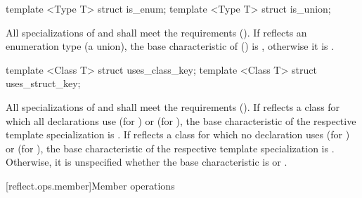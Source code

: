 \begin{std.txt}
\begin{itemdecl}
template <Type T> struct is_enum;
template <Type T> struct is_union;
\end{itemdecl}

\begin{itemdescr}
\pnum
All specializations of  and  shall meet the  requirements (). If  reflects an enumeration type (a union), the base characteristic of  () is , otherwise it is .
\end{itemdescr}

\begin{itemdecl}
template <Class T> struct uses_class_key;
template <Class T> struct uses_struct_key;
\end{itemdecl}

\begin{itemdescr}
\pnum
All specializations of  and  shall meet the  requirements (). If  reflects a class for which all declarations use   (for ) or  (for ), the base characteristic of the respective template specialization is .
If  reflects a class for which no declaration uses   (for ) or  (for ), the base characteristic of the respective template specialization is . Otherwise, it is unspecified whether the base characteristic is  or .
\end{itemdescr}
\end{std.txt}

[reflect.ops.member]{Member operations}

